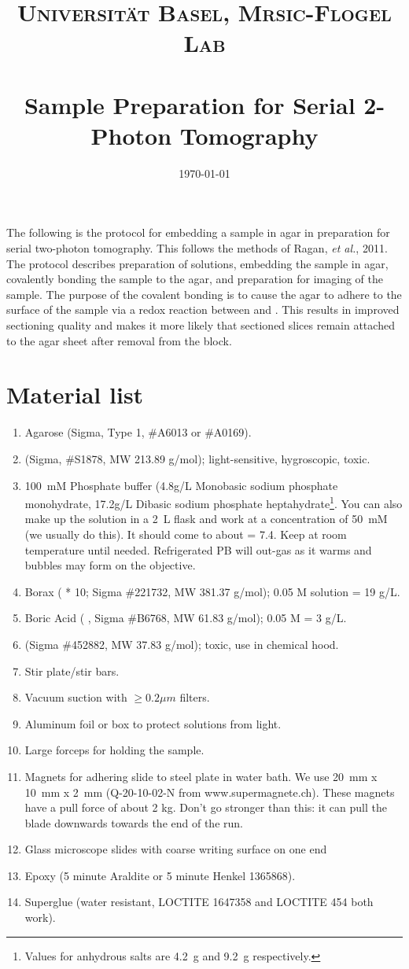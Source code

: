 \documentclass[paper=a4, fontsize=11pt]{scrartcl} %
\title{	
\normalfont \normalsize 
\textsc{Universit\"{a}t Basel, Mrsic-Flogel Lab} \\ [25pt] 
\horrule{0.5pt} \\[0.2cm] %
\huge Sample Preparation for Serial 2-Photon Tomography
\horrule{1.5pt}\\ %
}
\date{\normalsize\today} %
\numberwithin{equation}{section} %
\numberwithin{figure}{section} %
\numberwithin{table}{section} %
\begin{document}
\maketitle %

The following is the protocol for embedding a sample in agar in preparation for serial two-photon tomography. 
This follows the methods of Ragan, \textit{et al.}, 2011. 
The protocol describes preparation of solutions, embedding the sample in agar, covalently bonding the sample to the agar, and preparation for imaging of the sample.
The purpose of the covalent bonding is to cause the agar to adhere to the surface of the sample via a redox reaction between  and . 
This results in improved sectioning quality and makes it more likely that sectioned slices remain attached to the agar sheet after removal from the block. 


\section{Material list}
\begin{enumerate}
\item Agarose (Sigma, Type 1, \#A6013 or \#A0169).
\item {} (Sigma, \#S1878, MW 213.89 g/mol); light-sensitive, hygroscopic, toxic.
\item 100~mM Phosphate buffer (4.8g/L Monobasic sodium phosphate monohydrate, 17.2g/L Dibasic sodium phosphate heptahydrate\footnote{Values for anhydrous salts are 4.2~g and 9.2~g respectively.}. You can also make up the solution in a 2~L flask and work at a concentration of 50~mM (we usually do this). 
It should come to about \pH = 7.4.
Keep at room temperature until needed. 
Refrigerated PB will out-gas as it warms and bubbles may form on the objective. 
\item Borax ( * 10; Sigma \#221732, MW 381.37 g/mol); 0.05 M solution = 19 g/L.
\item Boric Acid ( , Sigma \#B6768, MW 61.83 g/mol); 0.05 M = 3 g/L.
\item {} (Sigma \#452882, MW 37.83 g/mol); toxic, use in chemical hood.
\item Stir plate/stir bars.
\item Vacuum suction with $\ge 0.2 \mu m$ filters.
\item Aluminum foil or box to protect solutions from light. 
\item Large forceps for holding the sample. 
\item Magnets for adhering slide to steel plate in water bath. We use 20~mm x 10~mm x 2~mm (Q-20-10-02-N from www.supermagnete.ch).
      These magnets have a pull force of about 2 kg. 
      Don't go stronger than this: it can pull the blade downwards towards the end of the run.
\item Glass microscope slides with coarse writing surface on one end
\item Epoxy (5 minute Araldite or 5 minute Henkel 1365868).
\item Superglue (water resistant, LOCTITE 1647358 and LOCTITE 454 both work).
\end{enumerate}
\end{document}
